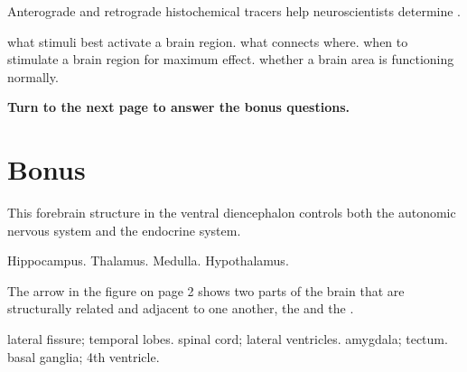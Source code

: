 \documentclass[answers]{exam}
\begin{document}
\begin{questions}



\question Anterograde and retrograde histochemical tracers help neuroscientists determine \fillin.
\begin{choices}
\choice what stimuli best activate a brain region.
\correctchoice what connects where.
\choice when to stimulate a brain region for maximum effect.
\choice whether a brain area is functioning normally.
\end{choices}

\begin{center}
\bfseries{Turn to the next page to answer the bonus questions.}
\end{center}

\newpage

\section{Bonus}

\question This forebrain structure in the ventral diencephalon controls both the autonomic nervous system and the endocrine system.
\begin{choices}
\choice Hippocampus.
\choice Thalamus.
\choice Medulla.
\correctchoice Hypothalamus.
\end{choices}

\question The arrow in the figure on page 2 shows two parts of the brain that are structurally related and adjacent to one another, the \fillin and the \fillin.
\begin{choices}
\correctchoice lateral fissure; temporal lobes.
\choice spinal cord; lateral ventricles.
\choice amygdala; tectum.
\choice basal ganglia; 4th ventricle.
\end{choices}

\end{questions}
\end{document}
